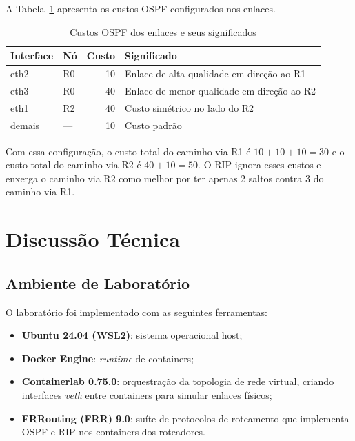 \documentclass[12pt]{article}
\begin{document}
A Tabela~\ref{tab:custos} apresenta os custos OSPF configurados nos enlaces.

\begin{table}[h]
\centering
\caption{Custos OSPF dos enlaces e seus significados}
\label{tab:custos}
\begin{tabular}{@{}llrl@{}}
\toprule
\textbf{Interface} & \textbf{Nó} & \textbf{Custo} & \textbf{Significado} \\
\midrule
eth2 & R0 & 10 & Enlace de alta qualidade em direção ao R1 \\
eth3 & R0 & 40 & Enlace de menor qualidade em direção ao R2 \\
eth1 & R2 & 40 & Custo simétrico no lado do R2 \\
demais & — & 10 & Custo padrão \\
\bottomrule
\end{tabular}
\end{table}

Com essa configuração, o custo total do caminho via R1 é $10 + 10 + 10 = 30$ e o
custo total do caminho via R2 é $40 + 10 = 50$. O RIP ignora esses custos e enxerga
o caminho via R2 como melhor por ter apenas 2 saltos contra 3 do caminho via R1.

\section{Discussão Técnica}
\label{sec:discussao}

\subsection{Ambiente de Laboratório}

O laboratório foi implementado com as seguintes ferramentas:

\begin{itemize}
  \item \textbf{Ubuntu 24.04 (WSL2)}: sistema operacional host;
  \item \textbf{Docker Engine}: \textit{runtime} de containers;
  \item \textbf{Containerlab 0.75.0}: orquestração da topologia de rede virtual,
        criando interfaces \textit{veth} entre containers para simular enlaces físicos;
  \item \textbf{FRRouting (FRR) 9.0}: suíte de protocolos de roteamento que
        implementa OSPF e RIP nos containers dos roteadores.
\end{itemize}
\end{document}
